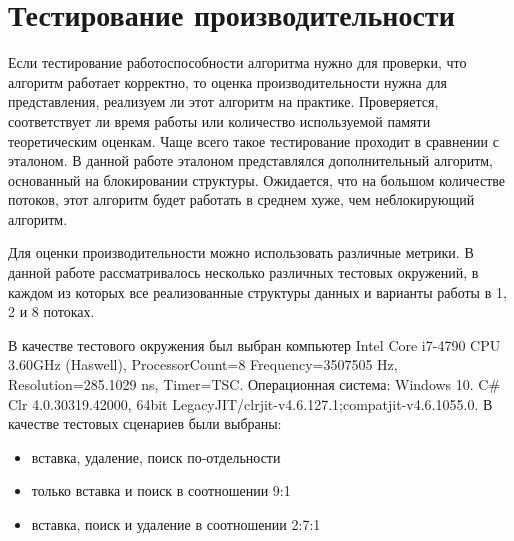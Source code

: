 \documentclass[12pt]{report}
\begin{document}
{		\section{Тестирование производительности}
		\par Если тестирование работоспособности алгоритма нужно для проверки, что алгоритм работает корректно, то оценка производительности нужна для представления, реализуем ли этот алгоритм на практике. Проверяется, соответствует ли время работы или количество используемой памяти теоретическим оценкам. Чаще всего такое тестирование проходит в сравнении с эталоном. В данной работе эталоном представлялся дополнительный алгоритм, основанный на блокировании структуры. Ожидается, что на большом количестве потоков, этот алгоритм будет работать в среднем хуже, чем неблокирующий алгоритм.
		\par Для оценки производительности можно использовать различные метрики. В данной работе рассматривалось несколько различных тестовых окружений, в каждом из которых все реализованные структуры данных и варианты работы в 1, 2 и 8 потоках. 
		\par В качестве тестового окружения был выбран компьютер Intel Core i7-4790 CPU 3.60GHz (Haswell), ProcessorCount=8 Frequency=3507505 Hz,  Resolution=285.1029 ns, Timer=TSC. Операционная система: Windows 10. C\# Clr 4.0.30319.42000, 64bit LegacyJIT/clrjit-v4.6.127.1;compatjit-v4.6.1055.0.
		В качестве тестовых сценариев были выбраны: 
		\begin{itemize}
			\item вставка, удаление, поиск по-отдельности
			\item только вставка и поиск в соотношении 9:1
			\item вставка, поиск и удаление в соотношении 2:7:1			
		\end{itemize}
}
\end{document}
